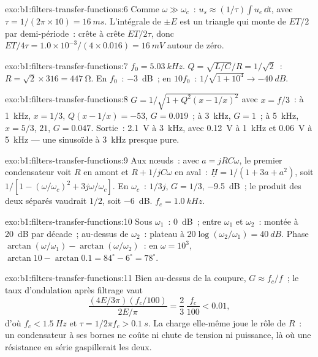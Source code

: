 \begin{solution}{exo:b1:filters-transfer-functions:6}
Comme $\omega \gg \omega_c$~: $u_s \approx (1/\tau)\int u_e\,\dd t$, avec $\tau =
1/(2\pi \times 10) = \qty{16}{ms}$. L'intégrale de $\pm E$ est un
triangle qui monte de $ET/2$ par demi-période~:  crête à crête
$ET/2\tau$, donc 
$ET/4\tau = 1.0 \times 10^{-3}/(4 \times 0.016) = \qty{16}{mV}$ autour de
zéro.
\end{solution}

\begin{solution}{exo:b1:filters-transfer-functions:7}
$f_0 = \qty{5.03}{kHz}$. $Q = \sqrt{L/C}/R = 1/\sqrt2$~: $R = \sqrt2 \times
316 = \qty{447}{\ohm}$. En $f_0$~: \qty{-3}{dB}~; en $10f_0$~: $1/\sqrt{1 +
10^4} \to \qty{-40}{dB}$.
\end{solution}

\begin{solution}{exo:b1:filters-transfer-functions:8}
$G = 1/\sqrt{1 + Q^2(x - 1/x)^2}$ avec $x = f/3$~: à \qty{1}{kHz}, $x = 1/3$,
$Q(x - 1/x) = -53$, $G = 0.019$~; à \qty{3}{kHz}, $G = 1$~; à \qty{5}{kHz},
$x = 5/3$, $21$, $G = 0.047$. Sortie~: \qty{2.1}{V} à \qty{3}{kHz}, avec
\qty{0.12}{V} à \qty{1}{kHz} et \qty{0.06}{V} à \qty{5}{kHz} --- une
sinusoïde à \qty{3}{kHz} presque pure.
\end{solution}

\begin{solution}{exo:b1:filters-transfer-functions:9}
Aux nœuds~: avec $a = jRC\omega$, le premier condensateur voit $R$ en
amont et $R + 1/jC\omega$ en aval~: $\underline H = 1/(1 + 3a + a^2)$, soit
$1/[1 - (\omega/\omega_c)^2 + 3j\omega/\omega_c]$. En $\omega_c$~: $1/3j$,
$G = 1/3$, \qty{-9.5}{dB}~; le produit des deux  séparés vaudrait
$1/2$, soit \qty{-6}{dB}. $f_c = \qty{1.0}{kHz}$.
\end{solution}

\begin{solution}{exo:b1:filters-transfer-functions:10}
Sous $\omega_1$~: \qty{0}{dB}~; entre $\omega_1$ et $\omega_2$~: montée à
\qty{20}{dB} par décade~; au-dessus de $\omega_2$~: plateau à $20\log(\omega_2/\omega_1) =
\qty{40}{dB}$. Phase $\arctan(\omega/\omega_1) - \arctan(\omega/\omega_2)$~:
en $\omega = 10^3$, $\arctan 10 - \arctan 0.1 = 84^\circ - 6^\circ =
78^\circ$.
\end{solution}

\begin{solution}{exo:b1:filters-transfer-functions:11}
Bien au-dessus de la coupure, $G \approx f_c/f$~; le taux d'ondulation
après filtrage vaut
\[
\frac{(4E/3\pi)(f_c/100)}{2E/\pi} = \frac{2}{3}\,\frac{f_c}{100} < 0.01,
\]
d'où $f_c < \qty{1.5}{Hz}$ et $\tau = 1/2\pi f_c > \qty{0.1}{s}$. La charge elle-même joue le rôle de
$R$~: un condensateur à ses bornes ne coûte ni chute de tension ni
puissance, là où une résistance en série gaspillerait les deux.
\end{solution}

